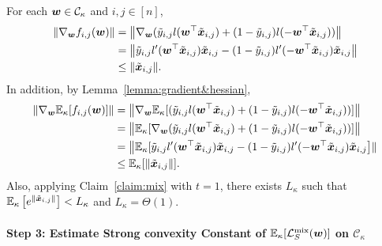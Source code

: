 For each ${\bm{w}} \in \mathcal{C}_\kappa$ and $i,j \in [n]$, 
\begin{align*}
\lVert \nabla_{\bm{w}} f_{i,j}({\bm{w}}) \rVert &= \left \lVert \nabla_{\bm{w}} (\tilde{y}_{i,j}l({\bm{w}}^\top \tilde{{\bm{x}}}_{i,j}) + (1-\tilde{y}_{i,j}) l(-{\bm{w}}^\top \tilde{{\bm{x}}}_{i,j})) \right \rVert\\
&= \left \lVert \tilde{y}_{i,j}l'({\bm{w}}^\top \tilde{{\bm{x}}}_{i,j})\tilde{{\bm{x}}}_{i,j} - (1-\tilde{y}_{i,j}) l'(-{\bm{w}}^\top \tilde{{\bm{x}}}_{i,j})\tilde{{\bm{x}}}_{i,j} \right \rVert\\
&\leq  \lVert \tilde{{\bm{x}}}_{i,j} \rVert.
\end{align*}
In addition, by Lemma~\ref{lemma:gradient&hessian},
\begin{align*}
\left\lVert \nabla_{\bm{w}} \mathbb{E}_\kappa [f_{i,j}({\bm{w}})]\right \rVert &=  \left \lVert \nabla_{\bm{w}} \mathbb{E}_\kappa[ (\tilde{y}_{i,j}l({\bm{w}}^\top \tilde{{\bm{x}}}_{i,j}) + (1-\tilde{y}_{i,j}) l(-{\bm{w}}^\top \tilde{{\bm{x}}}_{i,j}))]\right \rVert\\
&= \left   \lVert\mathbb{E}_\kappa[ \nabla_{\bm{w}}(\tilde{y}_{i,j}l({\bm{w}}^\top \tilde{{\bm{x}}}_{i,j}) + (1-\tilde{y}_{i,j}) l(-{\bm{w}}^\top \tilde{{\bm{x}}}_{i,j}))]\right \rVert\\
&= \left \lVert \mathbb{E}_\kappa[ \tilde{y}_{i,j}l'({\bm{w}}^\top \tilde{{\bm{x}}}_{i,j})\tilde{{\bm{x}}}_{i,j} - (1-\tilde{y}_{i,j}) l'(-{\bm{w}}^\top \tilde{{\bm{x}}}_{i,j})\tilde{{\bm{x}}}_{i,j} \right] \rVert \\
&\leq \mathbb{E}_\kappa [\lVert \tilde{{\bm{x}}}_{i,j}\rVert].
\end{align*}
Also, applying Claim~\ref{claim:mix} with $t = 1$, there exists $L_\kappa$ such that $\mathbb{E}_\kappa \left[ e^{\lVert \tilde{{\bm{x}}}_{i,j} \rVert}\right]< L_\kappa$ and $L_\kappa = \Theta(1)$.


\paragraph{Step 3: Estimate Strong convexity Constant of $\mathbb{E}_\kappa[\mathcal{L}_S^\mathrm{mix} ({\bm{w}})]$ on $\mathcal{C}_\kappa$} \quad


